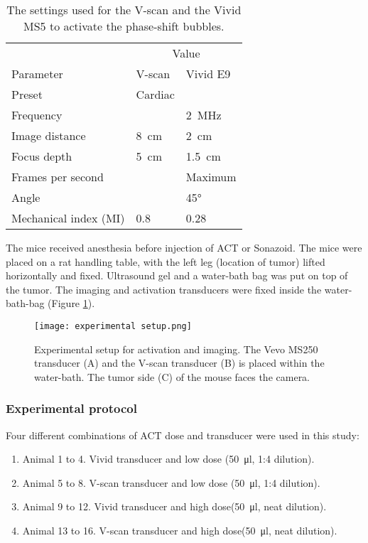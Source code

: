  
\begin{table}[htb]
\caption{The settings used for the V-scan and the Vivid MS5 to activate the phase-shift bubbles.}
\label{tab:V-scan vivid}
\begin{center}
\begin{tabular}{@{}l l l @{}}\toprule
& \multicolumn{2}{c}{Value} \\ \cmidrule(r){2-3}
Parameter & V-scan & Vivid E9\\
\midrule
Preset & Cardiac & \\
Frequency & & \SI{2}{\mega\hertz}\\
Image distance & \SI{8}{\centi\meter} & \SI{2}{\centi\meter}\\
Focus depth & \SI{5}{\centi\meter} & \SI{1.5}{\centi\meter}\\
Frames per second & &Maximum\\
Angle & & \ang{45}\\
Mechanical index (MI) & \num{0.8} & \num{0.28} \\
  \bottomrule
\end{tabular}
\end{center}
\end{table}

The mice received anesthesia before injection of ACT\texttrademark{} or Sonazoid\texttrademark{}. The mice were placed on a rat handling table, with the left leg (location of tumor) lifted horizontally and fixed. Ultrasound gel and a water-bath bag was put on top of the tumor. The imaging and activation transducers were fixed inside the water-bath-bag (Figure \ref{Fig:setup}).

\begin{figure}[h]
  \centering
  \texttt{[image: experimental setup.png]}
  \caption{Experimental setup for activation and imaging. The Vevo MS250 transducer (A) and the V-scan transducer (B) is placed within the water-bath. The tumor side (C) of the mouse faces the camera.}
  \label{Fig:setup}
\end{figure}



\subsubsection{Experimental protocol}
Four different combinations of ACT\texttrademark{} dose and transducer were used in this study:

\begin{enumerate}
  \item Animal 1 to 4. Vivid transducer and low dose (\SI{50}{\micro\litre}, 1:4 dilution).
  \item Animal 5 to 8. V-scan transducer and low dose (\SI{50}{\micro\litre}, 1:4 dilution).
  \item Animal 9 to 12. Vivid transducer and high dose(\SI{50}{\micro\litre}, neat dilution).
  \item Animal 13 to 16. V-scan transducer and high dose(\SI{50}{\micro\litre}, neat dilution).
\end{enumerate}
 
